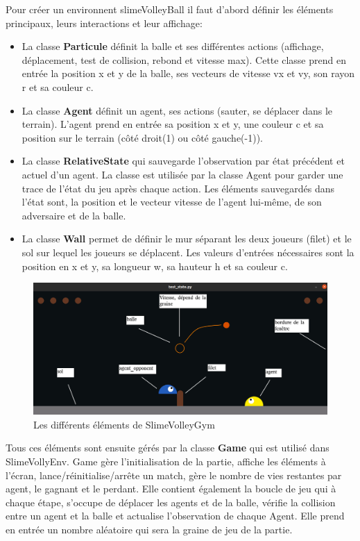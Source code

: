 \documentclass[11pt, a4paper]{article}
\begin{document}
	Pour créer un environnent slimeVolleyBall il faut d'abord définir les éléments principaux, leurs interactions et leur affichage:
	\begin{itemize}
		\item La classe \textbf{Particule} définit la balle et ses différentes actions (affichage, déplacement, test de collision, rebond et vitesse max). Cette classe prend en entrée la position x et y de la balle, ses vecteurs de vitesse vx et vy, son rayon r et sa couleur c.
		\item La classe \textbf{Agent} définit un agent, ses actions (sauter, se déplacer dans le terrain). L'agent prend en entrée sa position x et y, une couleur c et sa position sur le terrain (côté droit(1) ou côté gauche(-1)).
		\item La classe \textbf{RelativeState} qui sauvegarde l'observation par état précédent et actuel d'un agent. La classe est utilisée par la classe Agent pour garder une trace de l'état du jeu après chaque action. Les éléments sauvegardés dans l'état sont, la position et le vecteur vitesse de l'agent lui-même, de son adversaire et de la balle.
		\item La classe \textbf{Wall} permet de définir le mur séparant les deux joueurs (filet) et le sol sur lequel les joueurs se déplacent. Les valeurs d'entrées nécessaires sont la position en x et y, sa longueur w, sa hauteur h et sa couleur c.
	\end{itemize}
	\begin{figure}[H]
		\centering
		\includegraphics[scale=0.4]{images/schema.png}
		\caption {Les différents éléments de SlimeVolleyGym \cite{slimevolleygym}}
	\end{figure}

	Tous ces éléments sont ensuite gérés par la classe \textbf{Game} qui est utilisé dans SlimeVollyEnv. Game gère l'initialisation de la partie, affiche les éléments à l'écran, lance/réinitialise/arrête un match, gère le nombre de vies restantes par agent, le gagnant et le perdant. Elle contient également la boucle de jeu qui à chaque étape, s'occupe de déplacer les agents et de la balle, vérifie la collision entre un agent et la balle et actualise l'observation de chaque Agent. Elle prend en entrée un nombre aléatoire qui sera la graine de jeu de la partie.
\end{document}
